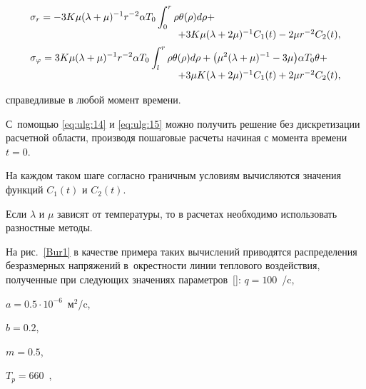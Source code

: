 \begin{equation} \label{eq:ulg:15} 

\begin{array}{l} 

\displaystyle

\sigma _{r} =-3K\mu (\lambda +\mu )^{-1} r^{-2} \alpha T_{0} 

\int _{0}^{r}\rho \theta (\rho )d\rho+  \\ 

\hfill +3K\mu (\lambda +2\mu )^{-1} C_{1} (t)-2\mu r^{-2} C_{2} (t), 

\\[2mm]

\displaystyle

\sigma _{\varphi} =3K\mu (\lambda +\mu )^{-1} r^{-2} \alpha T_{0} 

\int _{l}^{r}\rho \theta (\rho )d\rho  + \bigl(\mu ^{2} (\lambda +\mu )^{-1} -3\mu \bigr)\alpha T_{0} \theta +~~~~ 

\\ 

\hfill 

+3\mu K (\lambda +2\mu )^{-1} C_{1} (t)+2\mu r^{-2} C_{2} (t), 

\end{array} 

\end{equation} 

справедливые в любой момент времени.

 

С~помощью \eqref{eq:ulg:14} и \eqref{eq:ulg:15} можно получить решение без дискретизации расчетной области, производя пошаговые расчеты начиная с момента времени $t=0$. 

На каждом таком шаге согласно граничным условиям вычисляются значения функций $C_{1} (t)$ и $C_{2} (t)$. 



Если  $\lambda $ и $\mu $ зависят от температуры, то в расчетах необходимо использовать разностные методы. 

На рис.~\ref{Bur1} в качестве примера таких вычислений приводятся распределения безразмерных напряжений в~окрестности линии теплового воздействия, полученные при следующих значениях параметров~[]: $q=100$~\textcelsius/c, 

$a=0.5\cdot 10^{-6}$~м$^{2}$/c, 

$b =0.2$, 

$m =0.5$, 

$T_{p} =660$~\textcelsius, 

